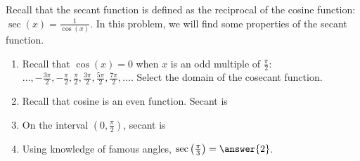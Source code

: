 \documentclass{ximera}
\author{Kenneth Berglund}
\begin{document}
Recall that the secant function is defined as the reciprocal of the cosine function: $\sec(x) = \frac{1}{\cos(x)}$. In this problem, we will find some properties of the secant function. 
\begin{exercise}
\begin{enumerate}
\item Recall that $\cos(x) = 0$ when $x$ is an odd multiple of $\frac{\pi}{2}$: $\ldots, -\frac{3\pi}{2}, -\frac{\pi}{2}, \frac{\pi}{2}, \frac{3\pi}{2}, \frac{5\pi}{2}, \frac{7\pi}{2}, \ldots$. Select the domain of the cosecant function.
\begin{multipleChoice}
\choice{$(- \infty, \infty)$}
\end{multipleChoice}


\item Recall that cosine is an even function. Secant is 
\begin{multipleChoice}
\end{multipleChoice}


\item On the interval $\left(0, \frac{\pi}{2}\right)$, secant is 
\begin{multipleChoice}
\end{multipleChoice}

\item Using knowledge of famous angles, $\sec\left(\frac{\pi}{3}\right) = \answer{2}$.


\end{enumerate}
\end{exercise}
\end{document}
